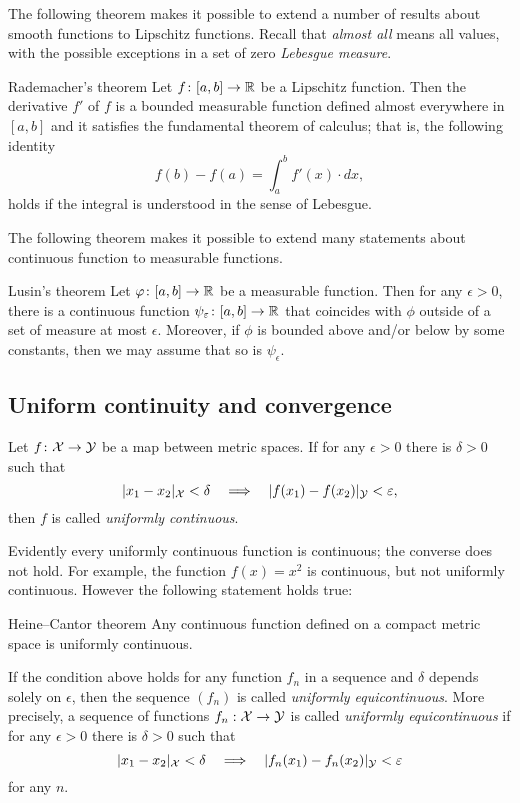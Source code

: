 The following theorem makes it possible to extend a number of results about smooth functions to Lipschitz functions.
Recall that {}\emph{almost all} means all values, with the possible exceptions in a set of zero {}\emph{Lebesgue measure}.

\begin{thm}{Rademacher's theorem}\label{thm:rademacher}
Let $f\colon[a,b]\to\mathbb{R}$ be a Lipschitz function.
Then the derivative $f'$ of $f$ is a bounded measurable function defined almost everywhere in $[a,b]$ and it satisfies the fundamental theorem of calculus; that is, the following identity 
\[f(b)-f(a)=\int_a^b f'(x)\cdot dx,\]
holds if the integral is understood in the sense of Lebesgue.
\end{thm}

The following theorem makes it possible to extend many statements about continuous function to measurable functions.

\begin{thm}{Lusin's theorem}\label{thm:lusin}
Let $\varphi\colon[a,b]\to \mathbb{R}$ be a measurable function.
Then for any $\epsilon>0$, there is a continuous function $\psi_\varepsilon\colon[a,b]\to \mathbb{R}$ that coincides with $\phi$ outside of a set of measure at most $\epsilon$.
Moreover, if $\phi$ is bounded above and/or below by some constants, then we may assume that so is $\psi_\epsilon$.  
\end{thm}

\subsection*{Uniform continuity and convergence}

Let $f\colon{\mathcal{X}}\to \mathcal{Y}$ be a map between metric spaces.
If  for any $\epsilon>0$ there is $\delta>0$ such that 
\[\dist{x_1}{x_2}{\spc{X}}<\delta\quad\Longrightarrow\quad |f(x_1)-f(x_2)|_\spc{Y}<\epsilon,\]
then $f$ is called \emph{uniformly continuous}.

Evidently every uniformly continuous function is continuous;
the converse does not hold.
For example, the function $f(x)=x^2$ is continuous, but not uniformly continuous.
However the following statement holds true:

\begin{thm}{Heine--Cantor theorem}
Any continuous function defined on a compact metric space is uniformly continuous.
\end{thm}

If the condition above holds for any function $f_n$ in a sequence and $\delta$ depends solely on $\epsilon$,
then the sequence $(f_n)$ is called \emph{uniformly equicontinuous}.
More precisely, 
a sequence of functions $f_n:{\mathcal{X}}\to \mathcal{Y}$ is called {}\emph{uniformly equicontinuous} if 
for any $\epsilon>0$ there is $\delta>0$ such that 
\[\dist{x_1}{x_2}{\spc{X}}<\delta\quad\Longrightarrow\quad \dist{f_n(x_1)}{f_n(x_2)}{\spc{Y}}<\epsilon\]
for any $n$.



